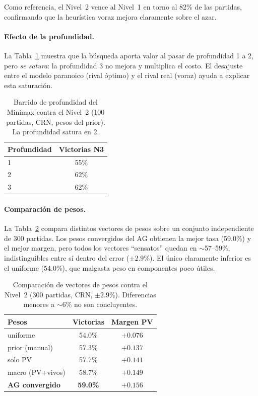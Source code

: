 \documentclass[11pt]{article}
\begin{document}
Como referencia, el Nivel~2 vence al Nivel~1 en torno al 82\% de las partidas,
confirmando que la heurística voraz mejora claramente sobre el azar.

\paragraph{Efecto de la profundidad.} La Tabla~\ref{tab:depth} muestra que la
búsqueda aporta valor al pasar de profundidad 1 a 2, pero \emph{se satura}: la
profundidad 3 no mejora y multiplica el costo. El desajuste entre el modelo
paranoico (rival óptimo) y el rival real (voraz) ayuda a explicar esta saturación.

\begin{table}[t]
  \centering
  \begin{tabular}{lc}
    \hline
    \textbf{Profundidad} & \textbf{Victorias N3} \\
    \hline
    1 & 55\% \\
    2 & 62\% \\
    3 & 62\% \\
    \hline
  \end{tabular}
  \caption{Barrido de profundidad del Minimax contra el Nivel~2 (100 partidas,
  CRN, pesos del prior). La profundidad satura en 2.}
  \label{tab:depth}
\end{table}

\paragraph{Comparación de pesos.} La Tabla~\ref{tab:pesos} compara distintos
vectores de pesos sobre un conjunto independiente de 300 partidas. Los pesos
convergidos del AG obtienen la mejor tasa (59.0\%) y el mejor margen, pero todos
los vectores ``sensatos'' quedan en $\sim$57--59\%, indistinguibles entre sí
dentro del error ($\pm 2.9\%$). El único claramente inferior es el uniforme
(54.0\%), que malgasta peso en componentes poco útiles.

\begin{table}[t]
  \centering
  \begin{tabular}{lcc}
    \hline
    \textbf{Pesos} & \textbf{Victorias} & \textbf{Margen PV} \\
    \hline
    uniforme                 & 54.0\% & $+0.076$ \\
    prior (manual)           & 57.3\% & $+0.137$ \\
    solo PV                  & 57.7\% & $+0.141$ \\
    macro (PV+vivos)         & 58.7\% & $+0.149$ \\
    \textbf{AG convergido}   & \textbf{59.0\%} & \textbf{$+0.156$} \\
    \hline
  \end{tabular}
  \caption{Comparación de vectores de pesos contra el Nivel~2
  (300 partidas, CRN, $\pm 2.9\%$). Diferencias menores a $\sim 6\%$ no son
  concluyentes.}
  \label{tab:pesos}
\end{table}
\end{document}
